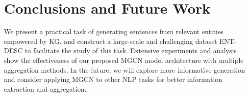 \documentclass[11pt,a4paper]{article}
\begin{document}
\begin{table}[t!]
	\centering
    \caption{Results on WebNLG dataset.}
	\label{tab:webnlg}
\end{table}

\section{Conclusions and Future Work}
We present a practical task of generating sentences from relevant entities empowered by KG, and construct a large-scale and challenging dataset ENT-DESC to facilitate the study of this task.
Extensive experiments and analysis show the effectiveness of our proposed MGCN model architecture with multiple aggregation methods.
In the future, we will explore more informative generation and
consider applying MGCN to other NLP tasks for better information extraction and aggregation.




\end{document}

